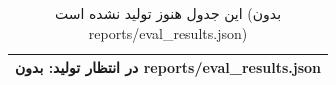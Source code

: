 \begin{table}[H]
\centering
\caption{این جدول هنوز تولید نشده است (بدون reports/eval\_results.json)}
\label{tab:v2-results}
\begin{tabular}{l}
\toprule
در انتظار تولید: بدون reports/eval\_results.json \\
\bottomrule
\end{tabular}
\end{table}
